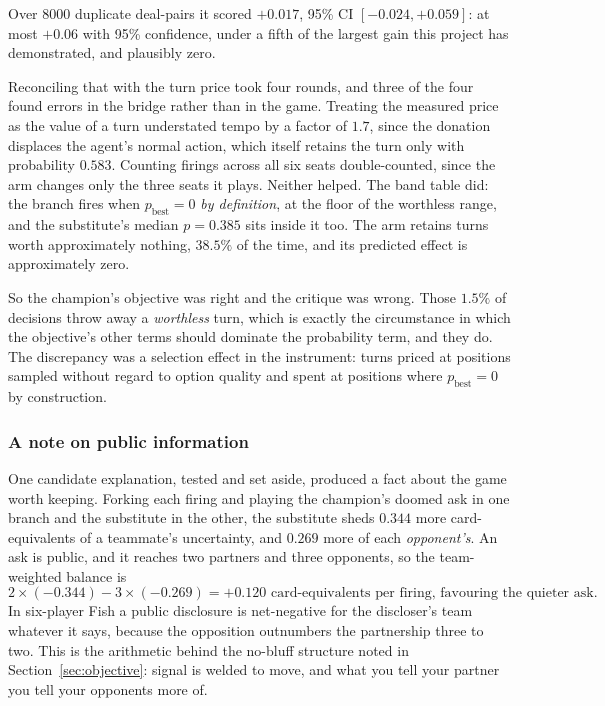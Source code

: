 \documentclass[11pt,letterpaper]{article}
\begin{document}
Over $8000$ duplicate deal-pairs it scored $+0.017$, 95\% CI
$[-0.024, +0.059]$: at most $+0.06$ with 95\% confidence, under a fifth of the
largest gain this project has demonstrated, and plausibly zero.

Reconciling that with the turn price took four rounds, and three of the four
found errors in the bridge rather than in the game. Treating the measured price
as the value of a turn understated tempo by a factor of $1.7$, since the
donation displaces the agent's normal action, which itself retains the turn
only with probability $0.583$. Counting firings across all six seats
double-counted, since the arm changes only the three seats it plays. Neither
helped. The band table did: the branch fires when $p_{\text{best}} = 0$
\emph{by definition}, at the floor of the worthless range, and the substitute's
median $p = 0.385$ sits inside it too. The arm retains turns worth
approximately nothing, $38.5\%$ of the time, and its predicted effect is
approximately zero.

So the champion's objective was right and the critique was wrong. Those $1.5\%$
of decisions throw away a \emph{worthless} turn, which is exactly the
circumstance in which the objective's other terms should dominate the
probability term, and they do. The discrepancy was a selection effect in the
instrument: turns priced at positions sampled without regard to option quality
and spent at positions where $p_{\text{best}} = 0$ by construction.

\subsubsection{A note on public information}

One candidate explanation, tested and set aside, produced a fact about the game
worth keeping. Forking each firing and playing the champion's doomed ask in one
branch and the substitute in the other, the substitute sheds $0.344$ more
card-equivalents of a teammate's uncertainty, and $0.269$ more of each
\emph{opponent's}. An ask is public, and it reaches two partners and three
opponents, so the team-weighted balance is
\[
2 \times (-0.344) - 3 \times (-0.269) = +0.120 \text{ card-equivalents per
firing, favouring the quieter ask.}
\]
In six-player Fish a public disclosure is net-negative for the discloser's team
whatever it says, because the opposition outnumbers the partnership three to
two. This is the arithmetic behind the no-bluff structure noted in
Section~\ref{sec:objective}: signal is welded to move, and what you tell your
partner you tell your opponents more of.
\end{document}
